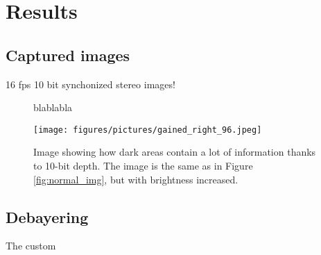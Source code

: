 \chapter{Results}
\label{chap:results}



\section{Captured images}
16 fps 10 bit synchonized stereo images!


\pagebreak

\begin{figure}[H]
    \centering
    \caption{blablabla}
\end{figure}



\begin{figure}[H]
    \centering
    \texttt{[image: figures/pictures/gained\_right\_96.jpeg]}
    \caption{Image showing how dark areas contain a lot of information thanks to 10-bit depth.
        The image is the same as in Figure \ref{fig:normal_img}, but with brightness increased.}
    \label{fig:gained_image}
\end{figure}
\section{Debayering}
The custom



